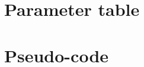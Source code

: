 \section{Parameter table}\label{app:params}

\begin{table}[H]\centering\footnotesize\renewcommand{\arraystretch}{1.0}\setlength{\tabcolsep}{4pt}
\caption{All model parameters (from \texttt{config/params\_default.yaml}, version 0.3). Where a row lists
several values they are in the order named in the parameter column. ``[verify]'' marks values taken from memory
of public sources that must be checked against the primary document.}\label{tab:params}
\end{table}

\section{Pseudo-code}\label{app:pseudo}

